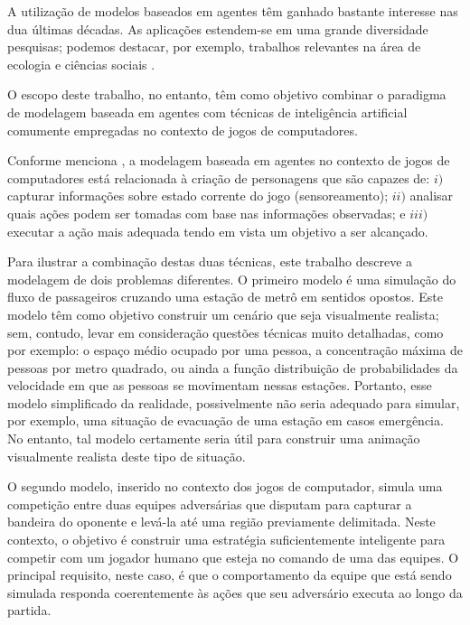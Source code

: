 \documentclass[preprint,12pt]{elsarticle}
\begin{document}
A utilização de modelos baseados em agentes têm ganhado bastante interesse nas dua últimas décadas. As aplicações estendem-se em uma grande diversidade pesquisas; podemos destacar, por exemplo, trabalhos relevantes na área de ecologia \cite{grimm2006standard} e ciências sociais \cite{bonabeau2002agent}. 

O escopo deste trabalho, no entanto, têm como objetivo combinar o paradigma de modelagem baseada em agentes com técnicas de inteligência artificial comumente empregadas no contexto de jogos de computadores.

\newpage

Conforme menciona \citet{millington2016artificial}, a modelagem baseada em agentes no contexto de jogos de computadores está relacionada à criação de personagens que são capazes de: $i)$ capturar informações sobre estado corrente do jogo (sensoreamento); $ii)$ analisar quais ações podem ser tomadas com base nas informações observadas; e $iii)$ executar a ação mais adequada tendo em vista um objetivo a ser alcançado.

Para ilustrar a combinação destas duas técnicas, este trabalho descreve a modelagem de dois problemas diferentes. O primeiro modelo é uma simulação do fluxo de passageiros cruzando uma estação de metrô em sentidos opostos. Este modelo têm como objetivo construir um cenário que seja visualmente realista; sem, contudo, levar em consideração questões técnicas muito detalhadas, como por exemplo: o espaço médio ocupado por uma pessoa, a concentração máxima de pessoas por metro quadrado, ou ainda a função distribuição de probabilidades da velocidade em que as pessoas se movimentam nessas estações. Portanto, esse modelo simplificado da realidade, possivelmente não seria adequado para simular, por exemplo, uma situação de evacuação de uma estação em casos emergência. No entanto, tal modelo certamente seria útil para construir uma animação visualmente realista deste tipo de situação.

O segundo modelo, inserido no contexto dos jogos de computador, simula uma competição entre duas equipes adversárias que disputam para capturar a bandeira do oponente e levá-la até uma região previamente delimitada. Neste contexto, o objetivo é construir uma estratégia suficientemente inteligente para competir com um jogador humano que esteja no comando de uma das equipes. O principal requisito, neste caso, é que o comportamento da equipe que está sendo simulada responda coerentemente às ações que seu adversário executa ao longo da partida.
\end{document}

